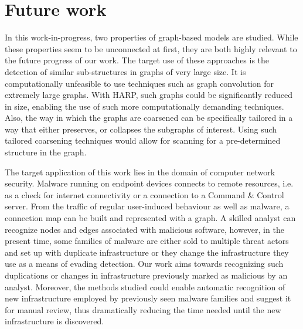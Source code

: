 \section{Future work}

In this work-in-progress, two properties of graph-based models are studied. While these properties seem to be unconnected at first, they are both highly relevant to the future progress of our work. The target use of these approaches is the detection of similar sub-structures in graphs of very large size. It is computationally unfeasible to use techniques such as graph convolution for extremely large graphs. With HARP, such graphs could be significantly reduced in size, enabling the use of such more computationally demanding techniques. Also, the way in which the graphs are coarsened can be specifically tailored in a way that either preserves, or collapses the subgraphs of interest. Using such tailored coarsening techniques would allow for scanning for a pre-determined structure in the graph.

The target application of this work lies in the domain of computer network security. Malware running on endpoint devices connects to remote resources, i.e. as a check for internet connectivity or a connection to a Command \& Control server. From the traffic of regular user-induced behaviour as well as malware, a connection map can be built and represented with a graph. A skilled analyst can recognize nodes and edges associated with malicious software, however, in the present time, some families of malware are either sold to multiple threat actors and set up with duplicate infrastructure or they change the infrastructure they use as a means of evading detection. Our work aims towards recognizing such duplications or changes in infrastructure previously marked as malicious by an analyst. Moreover, the methods studied could enable automatic recognition of new infrastructure employed by previously seen malware families and suggest it for manual review, thus dramatically reducing the time needed until the new infrastructure is discovered. 
